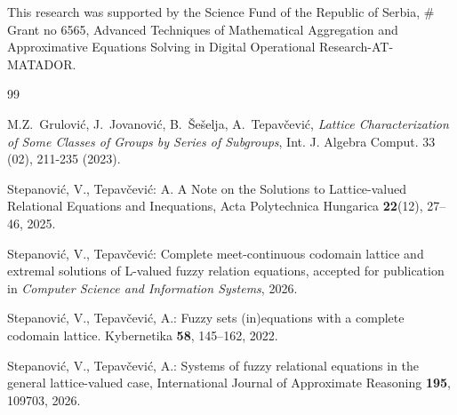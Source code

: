 \documentclass[a4paper]{article} %
\begin{document}
\vspace{0.5cm}
This 
 research was supported by the Science Fund of the Republic of Serbia, \# Grant no 6565,  Advanced Techniques of Mathematical Aggregation and Approximative Equations Solving in Digital Operational Research-AT-MATADOR. 





\begin{thebibliography}{99}

  M.Z.\ Grulovi\' c, J.\ Jovanovi\' c, B.\ \v{S}e\v{s}elja, A.\ Tepav\v{c}evi\'c,   \emph{Lattice Characterization of Some Classes of Groups by Series of Subgroups},  Int. J. Algebra Comput. 33 (02), 211-235 (2023).
 
 Stepanovi\'c, V., Tepav\v{c}evi\'c: A. A Note on the Solutions to Lattice-valued Relational Equations and Inequations, Acta Polytechnica Hungarica \textbf{22}(12), 27--46, 2025.

 Stepanovi\'c, V., Tepav\v{c}evi\'c: Complete meet-continuous codomain lattice and extremal solutions of L-valued fuzzy relation equations, accepted for publication in \emph{Computer Science and Information Systems}, 2026.


 Stepanovi\'c, V., Tepav\v{c}evi\'c, A.: Fuzzy sets (in)equations with a complete codomain lattice. Kybernetika \textbf{58}, 145--162, 2022.%

 Stepanovi\'c, V., Tepav\v{c}evi\'c, A.:
Systems of fuzzy relational equations in the general lattice-valued case,
International Journal of Approximate Reasoning
\textbf{195},
109703, 2026. 


\end{thebibliography}
\end{document}
